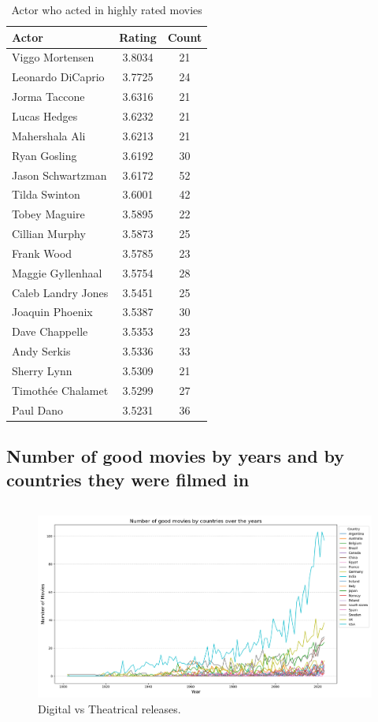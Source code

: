 \documentclass{Configuration_Files/PoliMi3i_thesis}
\begin{document}
\begin{table}
\centering
\begin{tabular}[h!]{|l|c|c|}
\hline
\textbf{Actor} & \textbf{Rating} & \textbf{Count} \\
\hline
Viggo Mortensen & 3.8034 & 21 \\
Leonardo DiCaprio & 3.7725 & 24 \\
Jorma Taccone & 3.6316 & 21 \\
Lucas Hedges & 3.6232 & 21 \\
Mahershala Ali & 3.6213 & 21 \\
Ryan Gosling & 3.6192 & 30 \\
Jason Schwartzman & 3.6172 & 52 \\
Tilda Swinton & 3.6001 & 42 \\
Tobey Maguire & 3.5895 & 22 \\
Cillian Murphy & 3.5873 & 25 \\
Frank Wood & 3.5785 & 23 \\
Maggie Gyllenhaal & 3.5754 & 28 \\
Caleb Landry Jones & 3.5451 & 25 \\
Joaquin Phoenix & 3.5387 & 30 \\
Dave Chappelle & 3.5353 & 23 \\
Andy Serkis & 3.5336 & 33 \\
Sherry Lynn & 3.5309 & 21 \\
Timothée Chalamet & 3.5299 & 27 \\
Paul Dano & 3.5231 & 36 \\
\hline
\end{tabular}
\caption{Actor who acted in highly rated movies}
\end{table}

\subsection{Number of good movies by years and by  countries they were filmed in}

\inputminted[frame=single,framesep=10pt,breaklines]{cypher}{letterboxd/queries/query7.cypher}

\begin{figure}[!h]
  \centering
  \includegraphics[width=\textwidth]{Project Template/letterboxd/visualization/good_movies_by_country.png}
  \caption{Digital vs Theatrical releases.}
  \label{fig:good_movies_by_countries}
\end{figure}
\end{document}

